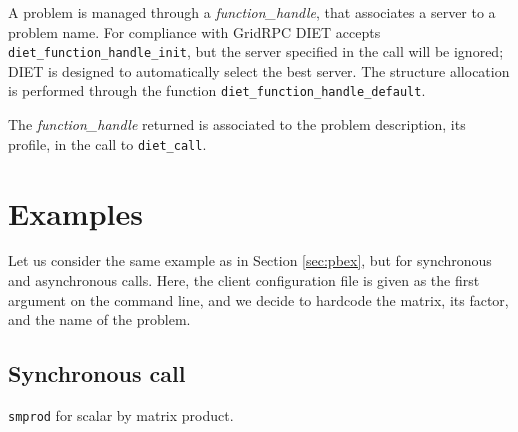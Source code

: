    A problem is managed through a \emph{function\_handle}, that
associates a server to a problem name. For compliance with GridRPC
DIET accepts \texttt{diet\_function\_handle\_init}, but the server 
specified in the call will be ignored; DIET is designed to
automatically select the best server. The structure allocation is
performed through the function
\texttt{diet\_function\_handle\_default}.

The \emph{function\_handle} returned is associated to the problem description,
its profile, in the call to \texttt{diet\_call}.

\section{Examples}
\label{sec:cl_ex}

Let us consider the same example as in Section \ref{sec:pbex}, but
for synchronous and asynchronous calls.  Here, the client
configuration file is given as the first argument on the command
line, and we decide to hardcode the matrix, its factor, and the name
of the problem.

\subsection{Synchronous call}
\texttt{smprod}
for scalar by matrix product.

